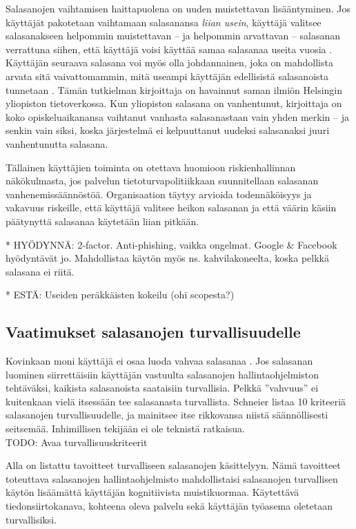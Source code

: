 \documentclass[english,gradu]{tktltiki}
\begin{document}
Salasanojen vaihtamisen haittapuolena on uuden muistettavan lisääntyminen. Jos käyttäjät pakotetaan vaihtamaan salasanansa \emph{liian usein}, käyttäjä valitsee salasanakseen helpommin muistettavan -- ja helpommin arvattavan -- salasanan verrattuna siihen, että käyttäjä voisi käyttää samaa salasanaa useita vuosia \cite{schneier_changing_passwords_10}. Käyttäjän seuraava salasana voi myös olla johdannainen, joka on mahdollista arvata sitä vaivattomammin, mitä useampi käyttäjän edellisistä salasanoista tunnetaan \cite{password_expiration_10}. Tämän tutkielman kirjoittaja on havainnut saman ilmiön Helsingin yliopiston tietoverkossa. Kun yliopiston salasana on vanhentunut, kirjoittaja on koko opiskeluaikanansa vaihtanut vanhasta salasanastaan vain yhden merkin -- ja senkin vain siksi, koska järjestelmä ei kelpuuttanut uudeksi salasanaksi juuri vanhentunutta salasana.

Tällainen käyttäjien toiminta on otettava huomioon riskienhallinnan näkökulmasta, jos palvelun tietoturvapolitiikkaan suunnitellaan salasanan vanhenemissäännöstöä. Organisaation täytyy arvioida todennäköisyys ja vakavuus riskeille, että käyttäjä valitsee heikon salasanan ja että väärin käsiin päätynyttä salasanaa käytetään liian pitkään.

* HYÖDYNNÄ: 2-factor. Anti-phishing, vaikka ongelmat. Google \& Facebook hyödyntävät jo. Mahdollistaa käytön myös ns. kahvilakoneelta, koska pelkkä salasana ei riitä.

* ESTÄ: Useiden peräkkäisten kokeilu (ohi scopesta?)


\subsection{Vaatimukset salasanojen turvallisuudelle}

         Kovinkaan moni käyttäjä ei osaa luoda vahvaa salasanaa \cite{generating_and_remembering_pws_04, password_management_strategies_06}. Jos salasanan luominen siirrettäisiin käyttäjän vastuulta salasanojen hallintaohjelmiston tehtäväksi, kaikista salasanoista saataisiin turvallisia. Pelkkä ''vahvuus'' ei kuitenkaan vielä itsessään tee salasanasta turvallista.
         Schneier \cite{schneier_password_advice_09} listaa 10 kriteeriä salasanojen turvallisuudelle, ja mainitsee itse rikkovansa niistä säännöllisesti seitsemää. Inhimillisen tekijään ei ole teknistä ratkaisua.
         \\
         TODO: Avaa turvallisuuskriteerit

         Alla on listattu tavoitteet turvalliseen salasanojen käsittelyyn. Nämä tavoitteet toteuttava salasanojen hallintaohjelmisto mahdollistaisi salasanojen turvallisen käytön lisäämättä käyttäjän kognitiivista muistikuormaa. Käytettävä tiedonsiirtokanava, kohteena oleva palvelu sekä käyttäjän työasema oletetaan turvallisiksi.
\end{document}
